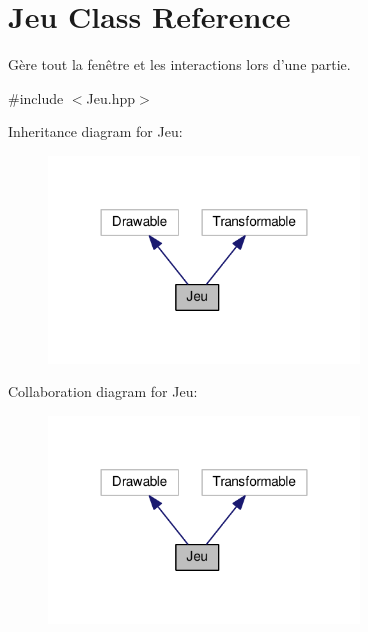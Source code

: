 \hypertarget{class_jeu}{\section{Jeu Class Reference}
\label{class_jeu}
}


Gère tout la fenêtre et les interactions lors d'une partie.  




{\ttfamily \#include $<$Jeu.\+hpp$>$}



Inheritance diagram for Jeu\+:
\nopagebreak
\begin{figure}[H]
\begin{center}
\leavevmode
\includegraphics[width=234pt]{class_jeu__inherit__graph}
\end{center}
\end{figure}


Collaboration diagram for Jeu\+:
\nopagebreak
\begin{figure}[H]
\begin{center}
\leavevmode
\includegraphics[width=234pt]{class_jeu__coll__graph}
\end{center}
\end{figure}
